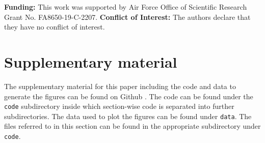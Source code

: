 \vspace{1in}

\textbf{Funding:} This work was supported by Air Force Office of Scientific Research Grant No. FA8650-19-C-2207.
\textbf{Conflict of Interest:} The authors declare that they have no conflict of interest.





\section{Supplementary material}
\label{sec:supp}
The supplementary material for this paper including the code and data to generate the figures can be found on Github \cite{supp}. The code can be found under the \verb+code+ subdirectory inside which section-wise code is separated into further subdirectories. The data used to plot the figures can be found under \verb+data+. The files referred to in this section can be found in the appropriate subdirectory under \verb+code+. 
